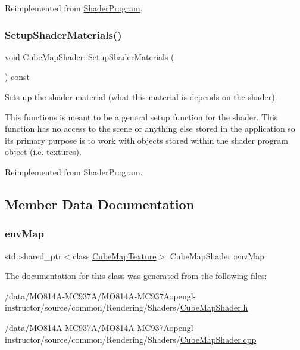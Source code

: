 Reimplemented from \hyperlink{class_shader_program_a20b5ed7b5f81154025eb7b6f1be70f84}{Shader\+Program}.

\hypertarget{class_cube_map_shader_a9deaf42646258af9237751f331fb215a}{}\label{class_cube_map_shader_a9deaf42646258af9237751f331fb215a}
\subsubsection{\texorpdfstring{Setup\+Shader\+Materials()}{SetupShaderMaterials()}}
{\footnotesize\ttfamily void Cube\+Map\+Shader\+::\+Setup\+Shader\+Materials (\begin{DoxyParamCaption}{ }\end{DoxyParamCaption}) const\hspace{0.3cm}{\ttfamily [virtual]}}



Sets up the shader material (what this material is depends on the shader).

This functions is meant to be a general setup function for the shader. This function has no access to the scene or anything else stored in the application so its primary purpose is to work with objects stored within the shader program object (i.\+e. textures).

Reimplemented from \hyperlink{class_shader_program_a20ea5669f122fa6143e7fa8ee9d92578}{Shader\+Program}.



\subsection{Member Data Documentation}
\hypertarget{class_cube_map_shader_ab9ea944d2b14c6a47406e36d9046caa6}{}\label{class_cube_map_shader_ab9ea944d2b14c6a47406e36d9046caa6}
\subsubsection{\texorpdfstring{env\+Map}{envMap}}
{\footnotesize\ttfamily std\+::shared\+\_\+ptr$<$class \hyperlink{class_cube_map_texture}{Cube\+Map\+Texture}$>$ Cube\+Map\+Shader\+::env\+Map\hspace{0.3cm}{\ttfamily [private]}}



The documentation for this class was generated from the following files\+:\begin{DoxyCompactItemize}
\item
/data/MO814A-MC937A/MO814A-MC937Aopengl-\/instructor/source/common/\+Rendering/\+Shaders/\hyperlink{_cube_map_shader_8h}{Cube\+Map\+Shader.\+h}\item
/data/MO814A-MC937A/MO814A-MC937Aopengl-\/instructor/source/common/\+Rendering/\+Shaders/\hyperlink{_cube_map_shader_8cpp}{Cube\+Map\+Shader.\+cpp}\end{DoxyCompactItemize}
